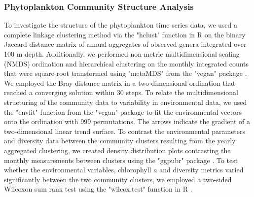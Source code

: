 \documentclass[draft]{agujournal2019}
\begin{document}
    \subsubsection{Phytoplankton Community Structure Analysis}
    To investigate the structure of the phytoplankton time series data, we used a complete linkage clustering method via the "hclust" function in R \cite{r_core_team_r_2024} on the binary Jaccard distance matrix of annual aggregates of observed genera integrated over 100 m depth. Additionally, we performed non-metric multidimensional scaling (NMDS) ordination and hierarchical clustering on the monthly integrated counts that were square-root transformed using "metaMDS" from the "vegan" package \cite{oksanen_vegan_2024}. We employed the Bray distance matrix in a two-dimensional ordination that reached a converging solution within 30 steps. To relate the multidimensional structuring of the community data to variability in environmental data, we used the "envfit" function from the "vegan" package to fit the environmental vectors onto the ordination with 999 permutations. The arrows indicate the gradient of a two-dimensional linear trend surface. 
    To contrast the environmental parameters and diversity data between the community clusters resulting from the yearly aggregated clustering, we created density distribution plots contrasting the monthly measurements between clusters using the "ggpubr" package \cite{kassambara_ggpubr_2023}. To test whether the environmental variables, chlorophyll $a$ and diversity metrics varied significantly between the two community clusters, we employed a two-sided Wilcoxon sum rank test using the "wilcox.test" function in R \cite{r_core_team_r_2024}.

        
\end{document}
